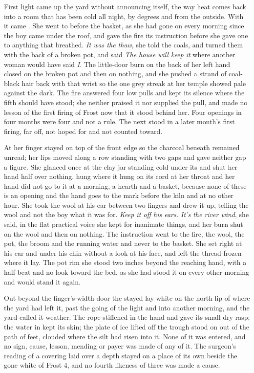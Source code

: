 First light came up the yard without announcing itself, the way heat comes back into a room that has been cold all night, by degrees and from the outside. With it came . She went to  before the basket, as she had gone on every morning since the boy came under the roof, and gave the fire its instruction before she gave one to anything that breathed. \emph{It was the thaw}, she told the coals, and turned them with the back of a broken pot, and said \emph{The house will keep it} where another woman would have said \emph{I}. The little-door burn on the back of her left hand closed on the broken pot and then on nothing, and she pushed a strand of coal-black hair back with that wrist so the one grey streak at her temple showed pale against the dark. The fire answered four low pulls and kept its silence where the fifth should have stood; she neither praised it nor supplied the pull, and made no lesson of the first firing of Frost now that it stood behind her. Four openings in four months were four and not a rule. The next stood in a later month's first firing, far off, not hoped for and not counted toward.

At  her finger stayed on top of the front edge so the charcoal beneath remained unread; her lips moved along a row standing with two gaps and gave neither gap a figure. She glanced once at the clay jar standing cold under its  and shut her hand half over nothing.  hung where it hung on its cord at her throat and her hand did not go to it at a morning, a hearth and a basket, because none of these is an opening and the hand goes to the mark before the kiln and at no other hour. She took the wool at his ear between two fingers and drew it up, telling the wool and not the boy what it was for. \emph{Keep it off his ears. It's the river wind}, she said, in the flat practical voice she kept for inanimate things, and her burn shut on the wool and then on nothing. The instruction went to the fire, the wool, the pot, the broom and the running water and never to the basket. She set  right at his ear and under his chin without a look at his face, and left the thread frozen where it lay. The pot rim she stood two inches beyond the reaching hand, with a half-beat and no look toward the bed, as she had stood it on every other morning and would stand it again.

Out beyond the finger's-width door the stayed  lay white on the north lip of  where the yard had left it, past the going of the light and into another morning, and the yard called it weather. The rope stiffened in the hand and gave its small dry rasp; the water in  kept its skin; the plate of ice lifted off the trough stood on  out of the path of feet, clouded where the silt had risen into it. None of it was entered, and no sign, cause, lesson, mending or payer was made of any of it. The surgeon's reading of a covering laid over a depth stayed on a place of its own beside the gone white of Frost 4, and no fourth likeness of three was made a cause.

